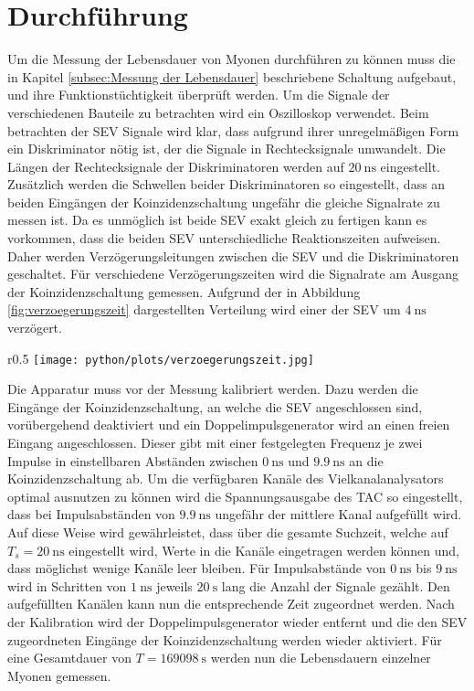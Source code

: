 \section{Durchführung}
\label{sec:Durchführung}
Um die Messung der Lebensdauer von Myonen durchführen zu können muss die in Kapitel \ref{subsec:Messung der Lebensdauer} beschriebene Schaltung aufgebaut, und ihre Funktionstüchtigkeit überprüft werden.
Um die Signale der verschiedenen Bauteile zu betrachten wird ein Oszilloskop verwendet.
Beim betrachten der SEV Signale wird klar, dass aufgrund ihrer unregelmäßigen Form ein Diskriminator nötig ist, der die Signale in Rechtecksignale umwandelt.
Die Längen der Rechtecksignale der Diskriminatoren werden auf $\SI{20}{\nano\second}$ eingestellt.
Zusätzlich werden die Schwellen beider Diskriminatoren so eingestellt, dass an beiden Eingängen der Koinzidenzschaltung ungefähr die gleiche Signalrate zu messen ist.
Da es unmöglich ist beide SEV exakt gleich zu fertigen kann es vorkommen, dass die beiden SEV unterschiedliche Reaktionszeiten aufweisen.
Daher werden Verzögerungsleitungen zwischen die SEV und die Diskriminatoren geschaltet.
Für verschiedene Verzögerungszeiten wird die Signalrate am Ausgang der Koinzidenzschaltung gemessen.
Aufgrund der in Abbildung \ref{fig:verzoegerungszeit} dargestellten Verteilung wird einer der SEV um $\SI{4}{\nano\second}$ verzögert.
\begin{wrapfigure}{r}{0.5\textwidth}
\centering
\texttt{[image: python/plots/verzoegerungszeit.jpg]}
\caption{Signalrate am Ausgang der Koinzidenzschaltung für verschiedene Verzögerungszeiten.}
\label{fig:verzoegerungszeit}
\end{wrapfigure}
Die Apparatur muss vor der Messung kalibriert werden.
Dazu werden die Eingänge der Koinzidenzschaltung, an welche die SEV angeschlossen sind, vorübergehend deaktiviert und ein Doppelimpulsgenerator wird an einen freien Eingang angeschlossen.
Dieser gibt mit einer festgelegten Frequenz je zwei Impulse in einstellbaren Abständen zwischen $\SI{0}{\nano\second}$ und $\SI{9.9}{\nano\second}$ an die Koinzidenzschaltung ab.
Um die verfügbaren Kanäle des Vielkanalanalysators optimal ausnutzen zu können wird die Spannungsausgabe des TAC so eingestellt, dass bei Impulsabständen von $\SI{9.9}{\nano\second}$ ungefähr der mittlere Kanal aufgefüllt wird.
Auf diese Weise wird gewährleistet, dass über die gesamte Suchzeit, welche auf $T_s=\SI{20}{\nano\second}$ eingestellt wird, Werte in die Kanäle eingetragen werden können und, dass möglichst wenige Kanäle leer bleiben.
Für Impulsabstände von $\SI{0}{\nano\second}$ bis $\SI{9}{\nano\second}$ wird in Schritten von $\SI{1}{\nano\second}$ jeweils $\SI{20}{\second}$ lang die Anzahl der Signale gezählt.
Den aufgefüllten Kanälen kann nun die entsprechende Zeit zugeordnet werden.
Nach der Kalibration wird der Doppelimpulsgenerator wieder entfernt und die den SEV zugeordneten Eingänge der Koinzidenzschaltung werden wieder aktiviert.
Für eine Gesamtdauer von $T=\SI{169098}{\second}$ werden nun die Lebensdauern einzelner Myonen gemessen.